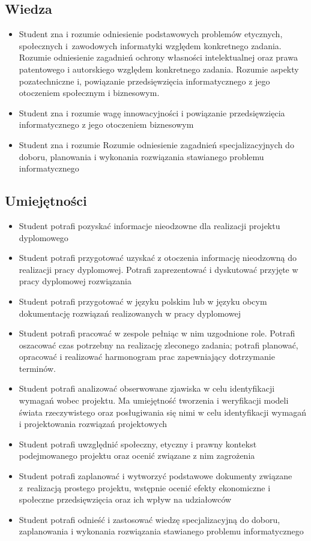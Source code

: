 \documentclass[12pt, a4paper]{article}
\begin{document}
\subsection*{Wiedza}
\begin{itemize}
  \item Student zna i rozumie  odniesienie podstawowych problemów etycznych, społecznych i zawodowych informatyki względem konkretnego zadania.  Rozumie odniesienie zagadnień ochrony własności intelektualnej oraz prawa patentowego i autorskiego względem konkretnego zadania.  Rozumie aspekty pozatechniczne i, powiązanie przedsięwzięcia informatycznego z jego  otoczeniem społecznym i biznesowym.
  \item Student zna i rozumie  wagę innowacyjności i powiązanie przedsięwzięcia informatycznego z jego otoczeniem biznesowym
  \item Student zna i rozumie  Rozumie odniesienie zagadnień specjalizacyjnych do doboru, planowania i wykonania rozwiązania stawianego problemu informatycznego
\end{itemize}

\subsection*{Umiejętności}
\begin{itemize}
  \item Student potrafi  pozyskać informacje nieodzowne dla realizacji projektu dyplomowego
  \item Student potrafi  przygotować uzyskać z otoczenia informację nieodzowną do realizacji pracy dyplomowej.  Potrafi zaprezentować i dyskutować przyjęte w pracy dyplomowej rozwiązania
  \item Student potrafi  przygotować w języku polskim lub w języku obcym dokumentację rozwiązań realizowanych w pracy dyplomowej
  \item Student potrafi  pracować w zespole pełniąc w nim uzgodnione role.  Potrafi oszacować czas potrzebny na realizację zleconego zadania; potrafi planować, opracować i realizować harmonogram prac zapewniający dotrzymanie terminów.
  \item Student potrafi   analizować obserwowane zjawiska w celu identyfikacji wymagań wobec projektu.  Ma umiejętność tworzenia i weryfikacji modeli świata rzeczywistego oraz posługiwania się nimi w celu identyfikacji wymagań i projektowania rozwiązań projektowych
  \item Student potrafi   uwzględnić społeczny, etyczny i prawny kontekst podejmowanego projektu oraz ocenić związane z nim zagrożenia
  \item Student potrafi  zaplanować i wytworzyć podstawowe dokumenty związane z realizacją prostego projektu, wstępnie ocenić efekty ekonomiczne i społeczne przedsięwzięcia oraz ich wpływ na udziałowców
  \item Student potrafi  odnieść i zastosować wiedzę  specjalizacyjną do doboru, zaplanowania i wykonania rozwiązania stawianego problemu informatycznego
\end{itemize}
\end{document}
